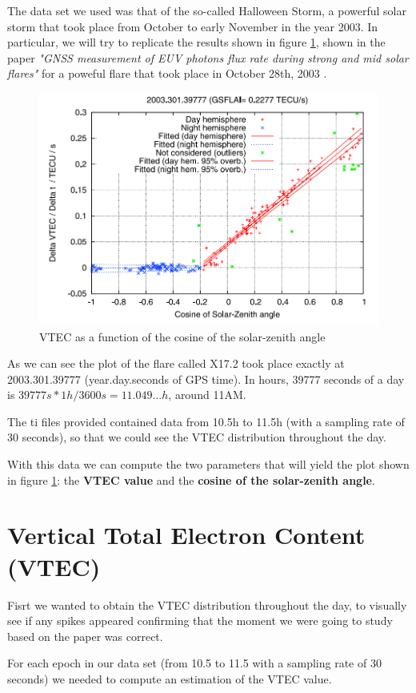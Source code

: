 The data set we used was that of the so-called Halloween Storm, a powerful solar storm that took place from October to early November in the year 2003. In particular, we will try to replicate the results shown in figure \ref{fig:halloweenPaper}, shown in the paper \textit{"GNSS measurement of EUV photons flux rate during strong and mid solar flares"} for a poweful flare that took place in October 28th, 2003 \cite{hernandez2012gnss}.

\begin{figure}[!htb]
	\begin{centering}
		\includegraphics[width=0.5\linewidth]{images/ch4/halloweenPaper.png}
		\caption{VTEC as a function of the cosine of the solar-zenith angle}
		\label{fig:halloweenPaper}
	\end{centering}
\end{figure}

As we can see the plot of the flare called X17.2 took place exactly at 2003.301.39777 (year.day.seconds of GPS time). In hours, 39777 seconds of a day is $39777s * 1h/3600s = 11.049...h$, around 11AM. 

The ti files provided contained data from 10.5h to 11.5h (with a sampling rate of 30 seconds), so that we could see the VTEC distribution throughout the day.

With this data we can compute the two parameters that will yield the plot shown in figure \ref{fig:halloweenPaper}: the \textbf{VTEC value} and the \textbf{cosine of the solar-zenith angle}.

\section{Vertical Total Electron Content (VTEC)}

Fisrt we wanted to obtain the VTEC distribution throughout the day, to visually see if any spikes appeared confirming that the moment we were going to study based on the paper was correct.

For each epoch in our data set (from 10.5 to 11.5 with a sampling rate of 30 seconds) we needed to compute an estimation of the VTEC value.

